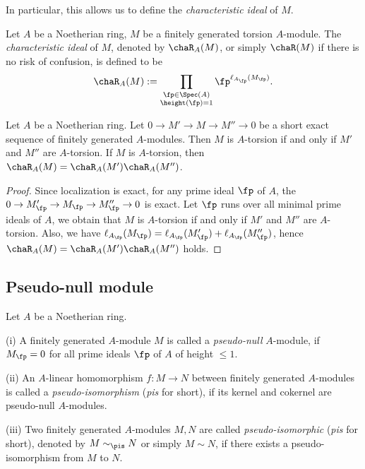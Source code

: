 In particular, this allows us to define the \emph{characteristic ideal} of $M$.

\begin{definition}
\label{char-ideal}
\leanok
Let $A$ be a Noetherian ring, $M$ be a
finitely generated torsion $A$-module.
The \emph{characteristic ideal} of $M$,
denoted by $\chaR_A(M)$, or simply $\chaR(M)$ if there is no risk of confusion, is defined to be
$$
\chaR_A(M):=\prod_{\substack{\fp\in\Spec(A)\\
\height(\fp)=1}}\fp^{\ell_{A_\fp}(M_\fp)}.
$$
\end{definition}

\begin{prop}
\label{char-ideal-additive}
\leanok
Let $A$ be a Noetherian ring.
Let $0\to M'\to M\to M''\to 0$ be a short exact sequence of finitely generated $A$-modules. Then $M$ is $A$-torsion if and only if $M'$ and $M''$ are $A$-torsion.
If $M$ is $A$-torsion, then $\chaR_A(M)=\chaR_A(M')\chaR_A(M'')$.
\end{prop}

\begin{proof}
\leanok
Since localization is exact, for any prime ideal $\fp$ of $A$,
the $0\to M_\fp'\to M_\fp\to M_\fp''\to 0$ is exact.
Let $\fp$ runs over all minimal prime ideals of $A$,
we obtain that $M$ is $A$-torsion if and only if $M'$ and $M''$ are $A$-torsion.
Also, we have $\ell_{A_\fp}(M_\fp)=\ell_{A_\fp}(M_\fp')+\ell_{A_\fp}(M_\fp'')$,
hence $\chaR_A(M)=\chaR_A(M')\chaR_A(M'')$ holds.
\end{proof}

\subsection{Pseudo-null module}

\begin{definition}
\label{pseudo-null}
\leanok
Let $A$ be a Noetherian ring.

{\rm(i)}
A finitely generated $A$-module $M$ is called a \emph{pseudo-null} $A$-module,
if $M_\fp=0$ for all prime ideals $\fp$ of $A$ of height $\leq 1$.

{\rm(ii)}
An $A$-linear homomorphism $f:M\to N$ between finitely generated $A$-modules
is called a \emph{pseudo-isomorphism} (\emph{pis} for short),
if its kernel and cokernel are pseudo-null $A$-modules.

{\rm(iii)}
Two finitely generated $A$-modules $M,N$ are called
\emph{pseudo-isomorphic} (\emph{pis} for short),
denoted by $M\sim_\pis N$ or simply $M\sim N$,
if there exists a pseudo-isomorphism from $M$ to $N$.
\end{definition}


